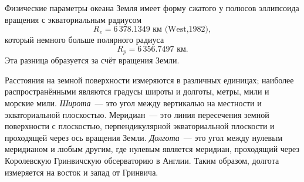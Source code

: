 
\begin{chapter}{Физические параметры океана}
Земля имеет форму сжатого у полюсов эллипсоида вращения с экваториальным
радиусом
$$
R_e=6\,378.1349\mbox{~км (West,1982)},
$$ 
который немного больше полярного радиуса 
$$
 R_p=6\,356.7497\mbox{~км}.
$$
Эта разница образуется за
счёт вращения Земли. %
%

Расстояния на земной поверхности измеряются в различных
единицах; наиболее распространёнными являются градусы широты и
долготы, метры, мили и морские мили. \emph{Широта}~--- это угол между
вертикалью на местности и экваториальной плоскостью. Меридиан~--- это
линия пересечения земной поверхности с плоскостью, перпендикулярной 
экваториальной плоскости и проходящей через ось вращения
Земли. \emph{Долгота}~--- это угол между нулевым меридианом и любым другим,
где нулевым является меридиан, проходящий через Королевскую Гринвичскую
обсерваторию в Англии. Таким образом, долгота измеряется на восток и
запад от Гринвича.
%


\end{chapter}
